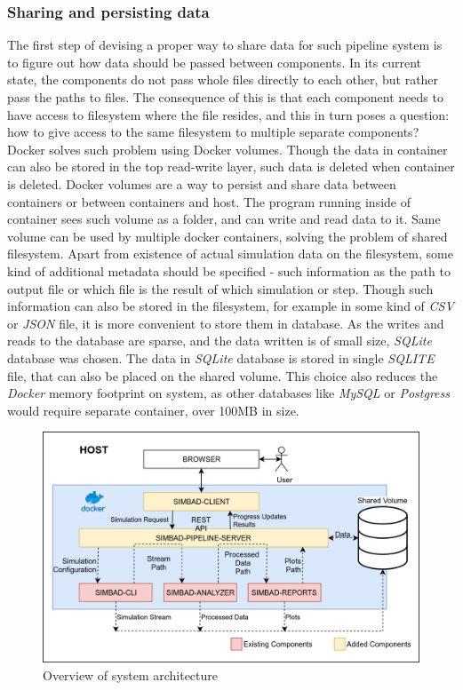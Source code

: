 \subsubsection{Sharing and persisting data}
The first step of devising a proper way to share data for such pipeline system is to figure out how data should be passed between components. In its current state, the components do not pass whole files directly to each other, but rather pass the paths to files. The consequence of this is that each component needs to have access to filesystem where the file resides, and this in turn poses a question: how to give access to the same filesystem to multiple separate components? Docker solves such problem using Docker volumes.  Though the data in container can also be stored in the top read-write layer, such data is deleted when container is deleted. Docker volumes are a way to persist and share data between containers or between containers and host. The program running inside of container sees such volume as a folder, and can write and read data to it. Same volume can be used by multiple docker containers, solving the problem of shared filesystem. Apart from existence of actual simulation data on the filesystem, some kind of additional metadata should be specified - such information as the path to output file or which file is the result of which simulation or step. Though such information can also be stored in the filesystem, for example in some kind of \textit{CSV} or \textit{JSON} file, it is more convenient to store them in database. As the writes and reads to the database are sparse, and the data written is of small size, \textit{SQLite} database was chosen. The data in \textit{SQLite} database is stored in single \textit{SQLITE} file, that can also be placed on the shared volume. This choice also reduces the \textit{Docker} memory footprint on system, as other databases like \textit{MySQL} or \textit{Postgress} would require separate container, over 100MB in size.
\begin{figure}[h!]
	\centering
		\includegraphics[width=0.9\linewidth]{diagrams/arch4.png}
	\caption{Overview of system architecture}
	\label{fig:arch4}
\end{figure}
